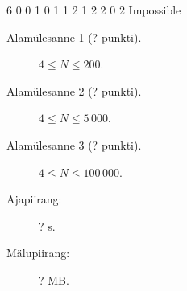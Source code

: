 \documentclass{boi2014-et}
\begin{document}
    \example
    {
        6
        0 0
        1 0
        1 1
        2 1
        2 2
        0 2
    }
    {
        Impossible
    }

    \Scoring

    \begin{description}
        \item[Alamülesanne 1 (? punkti).] $4 \le N \le 200$.
        \item[Alamülesanne 2 (? punkti).] $4 \le N \le 5\,000$.
        \item[Alamülesanne 3 (? punkti).] $4 \le N \le 100\,000$.
    \end{description}

    \Constraints

    \begin{description}
        \item[Ajapiirang:] ? s.
        \item[Mälupiirang:] ? MB.
    \end{description}
\end{document}
